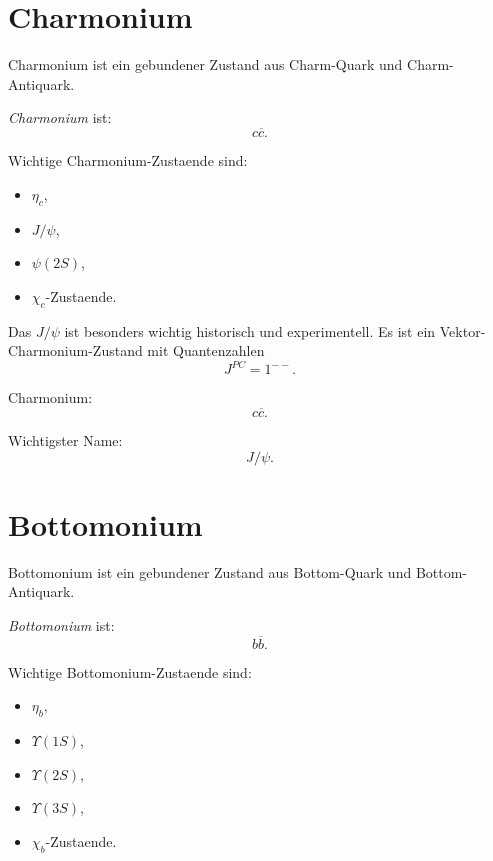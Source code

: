 \section{Charmonium}

Charmonium ist ein gebundener Zustand aus Charm-Quark und Charm-Antiquark.

\begin{definitionbox}
\emph{Charmonium} ist:
\[
    c\overline{c}.
\]
\end{definitionbox}

\begin{conceptbox}
Wichtige Charmonium-Zustaende sind:
\begin{itemize}
    \item $\eta_c$,
    \item $J/\psi$,
    \item $\psi(2S)$,
    \item $\chi_c$-Zustaende.
\end{itemize}
\end{conceptbox}

\begin{notebox}
Das $J/\psi$ ist besonders wichtig historisch und experimentell.
Es ist ein Vektor-Charmonium-Zustand mit Quantenzahlen
\[
    J^{PC}=1^{--}.
\]
\end{notebox}

\begin{examtipbox}
Charmonium:
\[
    c\overline{c}.
\]

Wichtigster Name:
\[
    J/\psi.
\]
\end{examtipbox}

\section{Bottomonium}

Bottomonium ist ein gebundener Zustand aus Bottom-Quark und Bottom-Antiquark.

\begin{definitionbox}
\emph{Bottomonium} ist:
\[
    b\overline{b}.
\]
\end{definitionbox}

\begin{conceptbox}
Wichtige Bottomonium-Zustaende sind:
\begin{itemize}
    \item $\eta_b$,
    \item $\Upsilon(1S)$,
    \item $\Upsilon(2S)$,
    \item $\Upsilon(3S)$,
    \item $\chi_b$-Zustaende.
\end{itemize}
\end{conceptbox}

